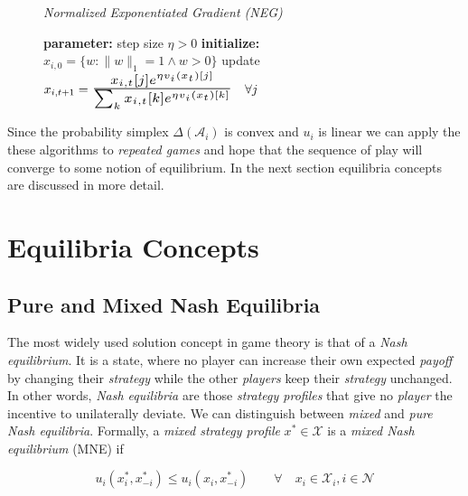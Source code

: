 \begin{figure}[H]\centering
    \textit{Normalized Exponentiated Gradient (NEG)}
    \begin{minipage}{.7\linewidth}
        \begin{algorithm}[H]
        \DontPrintSemicolon
        \textbf{parameter: } step size $\eta > 0$ \;
        \textbf{initialize: } $x_{i,0} =  \{w: \|w\|_1 = 1 \land w > 0\}$ \; 
         { 
        update $x_{i,t+1} = \scaleto{\frac{x_{i,t}[j]e^{\eta v_{i}(x_t)[j]}}{\sum_{k}x_{i,t}[k]e^{\eta v_{i}(x_t)[k]}}}{30pt} \quad \forall j$ \;
        }
        \end{algorithm}\caption*{}
  \end{minipage}
\end{figure}

Since the probability simplex $\Delta(\mathcal{A}_i)$ is convex and $u_i$ is linear we can apply the these algorithms to \textit{repeated games} and hope that the sequence of play will converge to some notion of equilibrium. In the next section equilibria concepts are discussed in more detail.


\section{Equilibria Concepts}\label{section:equilibriaConcepts}


\subsection{Pure and Mixed Nash Equilibria}\label{subsection:PNEandMNE}
The most widely used solution concept in game theory is that of a \textit{Nash equilibrium}. It is a state, where no player can increase their own expected \textit{payoff} by changing their \textit{strategy} while the other \textit{players} keep their \textit{strategy} unchanged. In other words, \textit{Nash equilibria} are those \textit{strategy profiles} that give no \textit{player} the incentive to unilaterally deviate. We can distinguish between \textit{mixed} and \textit{pure Nash equilibria}. Formally, a \textit{mixed strategy profile} $x^* \in \mathcal{X}$ is a \textit{mixed Nash equilibrium} (MNE) if

\begin{equation}\label{equ:MNE}
    u_i(x_{i}^{*},x_{-i}^{*}) \le  u_i(x_{i},x_{-i}^{*}) \qquad \forall \quad x_i \in \mathcal{X}_i, i \in \mathcal{N}
\end{equation}

